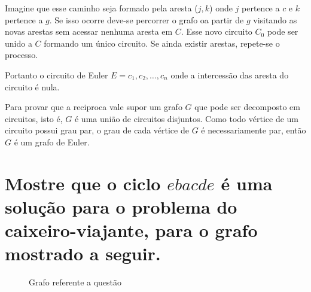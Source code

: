 \documentclass[a4paper,12pt]{article}
\begin{document}
	Imagine que esse caminho seja formado pela aresta ($j, k$) onde $j$ pertence a $c$ e $k$ pertence a $g$. Se isso ocorre deve-se percorrer o grafo oa partir de $g$ visitando as novas arestas sem acessar nenhuma aresta em $C$. Esse novo circuito $C_0$ pode ser unido a $C$ formando um único circuito. Se ainda existir arestas, repete-se o processo.

	Portanto o circuito de Euler $E = c_1, c_2, \ldots , c_n$ onde a intercessão das aresta do circuito é nula.

	Para provar que a reciproca vale supor um grafo $G$ que pode ser decomposto em circuitos, isto é, $G$ é uma união de circuitos disjuntos. Como todo vértice de um circuito possui grau par, o grau de cada vértice de $G$ é necessariamente par, então $G$ é um grafo de Euler.

\section{Mostre que o ciclo $ebacde$ é uma solução para o problema do caixeiro-viajante, para o grafo mostrado a seguir.}
	\begin{figure}[!ht]
		\centering
		\caption{Grafo referente a questão \thesection}
	\end{figure}
\end{document}
